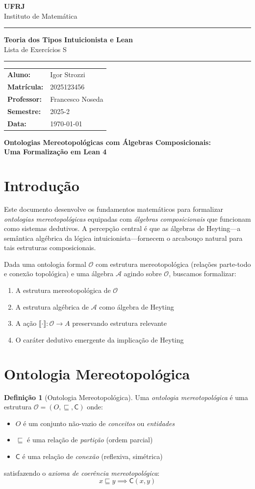 \documentclass[12pt,a4paper]{article}
\newcommand{\nomealuno}{Igor Strozzi}
\newcommand{\matricula}{2025123456}
\newcommand{\disciplina}{Teoria dos Tipos Intuicionista e Lean}
\newcommand{\professor}{Francesco Noseda}
\newcommand{\semestre}{2025-2}
\newcommand{\lista}{S}
\newcommand{\universidade}{UFRJ}
\newcommand{\departamento}{Instituto de Matemática}
\newcommand{\maketitlecustom}{
  \thispagestyle{empty}
  \begin{center}
    {\Large \textbf{\universidade}} \\[0.3cm]
    {\large \departamento} \\[0.5cm]
    \hrule
    \vspace{0.4cm}
    {\LARGE \textbf{\disciplina}} \\[0.3cm]
    {\Large Lista de Exercícios \lista} \\[0.5cm]
    \hrule
    \vspace{0.5cm}
    \begin{tabular}{ll}
      \textbf{Aluno:} & \nomealuno \\
      \textbf{Matrícula:} & \matricula \\
      \textbf{Professor:} & \professor \\
      \textbf{Semestre:} & \semestre \\
      \textbf{Data:} & \today
    \end{tabular}
  \end{center}
  \vspace{1cm}
}
\theoremstyle{definition}
\newtheorem{definicao}{Definição}[section]
\theoremstyle{plain}
\theoremstyle{remark}
\newcommand{\sem}[1]{\llbracket #1 \rrbracket}
\begin{document}
\maketitlecustom

\begin{center}
  \Large\textbf{Ontologias Mereotopológicas com Álgebras Composicionais:\\
  Uma Formalização em Lean 4}
\end{center}

\vspace{1em}

\tableofcontents
\newpage

\section{Introdução}

Este documento desenvolve os fundamentos matemáticos para formalizar \emph{ontologias mereotopológicas} equipadas com \emph{álgebras composicionais} que funcionam como sistemas dedutivos. A percepção central é que as álgebras de Heyting---a semântica algébrica da lógica intuicionista---fornecem o arcabouço natural para tais estruturas composicionais.

Dada uma ontologia formal $\mathcal{O}$ com estrutura mereotopológica (relações parte-todo e conexão topológica) e uma álgebra $\mathcal{A}$ agindo sobre $\mathcal{O}$, buscamos formalizar:
\begin{enumerate}
  \item A estrutura mereotopológica de $\mathcal{O}$
  \item A estrutura algébrica de $\mathcal{A}$ como álgebra de Heyting
  \item A ação $\sem{\cdot} : \mathcal{O} \to A$ preservando estrutura relevante
  \item O caráter dedutivo emergente da implicação de Heyting
\end{enumerate}

\section{Ontologia Mereotopológica}

\begin{definicao}[Ontologia Mereotopológica]
Uma \emph{ontologia mereotopológica} é uma estrutura $\mathcal{O} = (O, \sqsubseteq, \mathsf{C})$ onde:
\begin{itemize}
  \item $O$ é um conjunto não-vazio de \emph{conceitos} ou \emph{entidades}
  \item $\sqsubseteq$ é uma relação de \emph{partição} (ordem parcial)
  \item $\mathsf{C}$ é uma relação de \emph{conexão} (reflexiva, simétrica)
\end{itemize}
satisfazendo o \emph{axioma de coerência mereotopológica}:
$$
x \sqsubseteq y \implies \mathsf{C}(x, y)
$$
\end{definicao}
\end{document}
